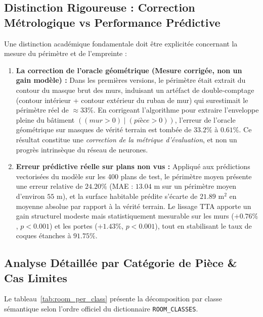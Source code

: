 \documentclass[11pt,a4paper]{report}
\begin{document}
\subsection{Distinction Rigoureuse : Correction Métrologique vs Performance Prédictive}
Une distinction académique fondamentale doit être explicitée concernant la mesure du périmètre et de l'empreinte :
\begin{enumerate}
    \item \textbf{La correction de l'oracle géométrique (Mesure corrigée, non un gain modèle) :} Dans les premières versions, le périmètre était extrait du contour du masque brut des murs, induisant un artéfact de double-comptage (contour intérieur + contour extérieur du ruban de mur) qui surestimait le périmètre réel de $\approx 33\%$. En corrigeant l'algorithme pour extraire l'enveloppe pleine du bâtiment $((mur > 0) \mid (pièce > 0))$, l'erreur de l'oracle géométrique sur masques de vérité terrain est tombée de $33.2\%$ à $0.61\%$. Ce résultat constitue une \emph{correction de la métrique d'évaluation}, et non un progrès intrinsèque du réseau de neurones.
    \item \textbf{Erreur prédictive réelle sur plans non vus :} Appliqué aux prédictions vectorisées du modèle sur les 400 plans de test, le périmètre moyen présente une erreur relative de $24.20\%$ (MAE : $13.04\text{ m}$ sur un périmètre moyen d'environ $55\text{ m}$), et la surface habitable prédite s'écarte de $21.89\text{ m}^2$ en moyenne absolue par rapport à la vérité terrain. Le lissage TTA apporte un gain structurel modeste mais statistiquement mesurable sur les murs ($+0.76\%$, $p < 0.001$) et les portes ($+1.43\%$, $p < 0.001$), tout en stabilisant le taux de coques étanches à $91.75\%$.
\end{enumerate}

\subsection{Analyse Détaillée par Catégorie de Pièce \& Cas Limites}
Le tableau~\ref{tab:room_per_class} présente la décomposition par classe sémantique selon l'ordre officiel du dictionnaire \texttt{ROOM\_CLASSES}.
\end{document}
